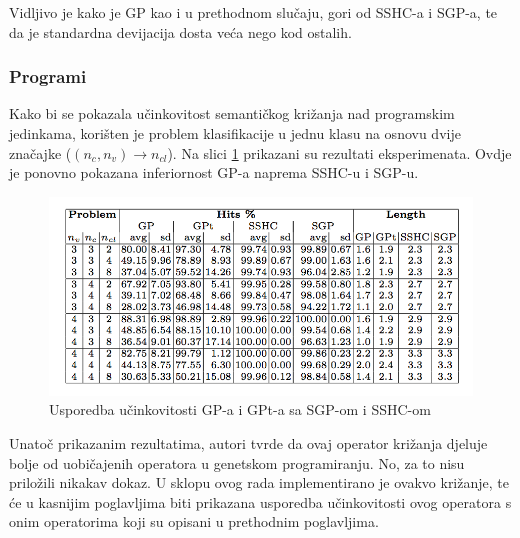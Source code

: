 Vidljivo je kako je GP kao i u prethodnom slučaju, gori od SSHC-a i SGP-a, te da je standardna devijacija dosta veća nego kod ostalih.

\subsubsection{Programi}

Kako bi se pokazala učinkovitost semantičkog križanja nad programskim jedinkama, korišten je problem klasifikacije u jednu klasu na osnovu dvije značajke ($(n_c, n_v) \to n_ {cl}$). Na slici \ref{semProg} prikazani su rezultati eksperimenata. Ovdje je ponovno pokazana inferiornost GP-a naprema SSHC-u i SGP-u.

 \begin{figure}[H]
	\centering
	\includegraphics[scale=0.5]{./slike/semProg.png}
	\caption{Usporedba učinkovitosti GP-a i GPt-a sa SGP-om i SSHC-om}
	\label{semProg}
\end{figure}

Unatoč prikazanim rezultatima, autori \cite{crxSem} tvrde da ovaj operator križanja djeluje bolje od uobičajenih operatora u genetskom programiranju. No, za to nisu priložili nikakav dokaz. U sklopu ovog rada implementirano je ovakvo križanje, te će u kasnijim poglavljima biti prikazana usporedba učinkovitosti ovog operatora s onim operatorima koji su opisani u prethodnim poglavljima.